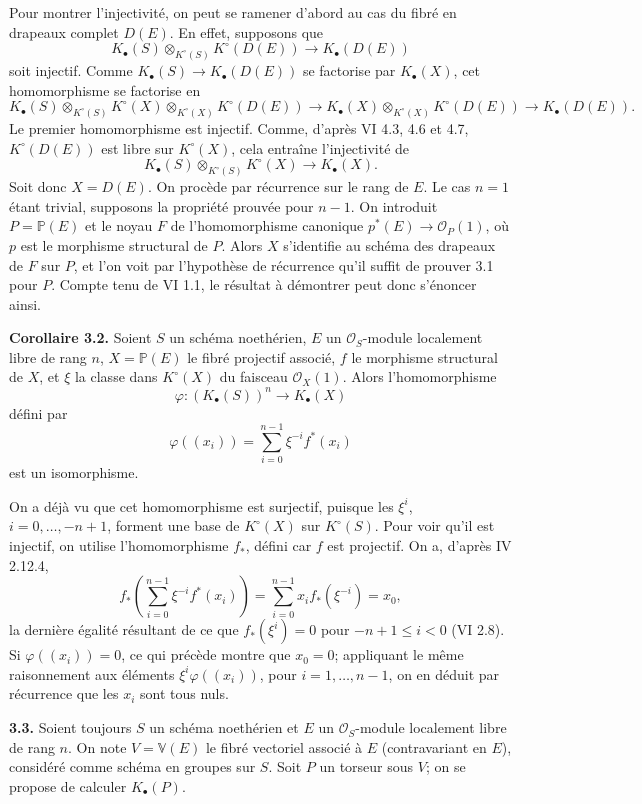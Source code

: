 \documentclass[11pt]{article}
\begin{document}
Pour montrer l'injectivité, on peut se ramener d'abord au cas du fibré en drapeaux complet $D(E)$. En effet, supposons que
\[
K_\bullet(S)\otimes_{K^\circ(S)}K^\circ(D(E))\longrightarrow K_\bullet(D(E))
\]
soit injectif. Comme $K_\bullet(S)\to K_\bullet(D(E))$ se factorise par $K_\bullet(X)$, cet homomorphisme se factorise en
\[
K_\bullet(S)\otimes_{K^\circ(S)}K^\circ(X)\otimes_{K^\circ(X)}K^\circ(D(E))
\longrightarrow K_\bullet(X)\otimes_{K^\circ(X)}K^\circ(D(E))
\longrightarrow K_\bullet(D(E)).
\]
Le premier homomorphisme est injectif. Comme, d'après VI 4.3, 4.6 et 4.7, $K^\circ(D(E))$ est libre sur $K^\circ(X)$, cela entraîne l'injectivité de
\[
K_\bullet(S)\otimes_{K^\circ(S)}K^\circ(X)\to K_\bullet(X).
\]
Soit donc $X=D(E)$. On procède par récurrence sur le rang de $E$. Le cas $n=1$ étant trivial, supposons la propriété prouvée pour $n-1$. On introduit $P=\mathbb P(E)$ et le noyau $F$ de l'homomorphisme canonique $p^*(E)\to \mathcal O_P(1)$, où $p$ est le morphisme structural de $P$. Alors $X$ s'identifie au schéma des drapeaux de $F$ sur $P$, et l'on voit par l'hypothèse de récurrence qu'il suffit de prouver 3.1 pour $P$. Compte tenu de VI 1.1, le résultat à démontrer peut donc s'énoncer ainsi.

\textbf{Corollaire 3.2.} Soient $S$ un schéma noethérien, $E$ un $\mathcal O_S$-module localement libre de rang $n$, $X=\mathbb P(E)$ le fibré projectif associé, $f$ le morphisme structural de $X$, et $\xi$ la classe dans $K^\circ(X)$ du faisceau $\mathcal O_X(1)$. Alors l'homomorphisme
\[
\varphi:(K_\bullet(S))^n\longrightarrow K_\bullet(X)
\]
défini par
\[
\varphi((x_i))=\sum_{i=0}^{n-1}\xi^{-i}f^*(x_i)
\]
est un isomorphisme.

On a déjà vu que cet homomorphisme est surjectif, puisque les $\xi^i$, $i=0,\ldots,-n+1$, forment une base de $K^\circ(X)$ sur $K^\circ(S)$. Pour voir qu'il est injectif, on utilise l'homomorphisme $f_*$, défini car $f$ est projectif. On a, d'après IV 2.12.4,
\[
f_*\left(\sum_{i=0}^{n-1}\xi^{-i}f^*(x_i)\right)
=\sum_{i=0}^{n-1}x_i f_*(\xi^{-i})=x_0,
\]
la dernière égalité résultant de ce que $f_*(\xi^i)=0$ pour $-n+1\le i<0$ (VI 2.8). Si $\varphi((x_i))=0$, ce qui précède montre que $x_0=0$; appliquant le même raisonnement aux éléments $\xi^i\varphi((x_i))$, pour $i=1,\ldots,n-1$, on en déduit par récurrence que les $x_i$ sont tous nuls.

\textbf{3.3.} Soient toujours $S$ un schéma noethérien et $E$ un $\mathcal O_S$-module localement libre de rang $n$. On note $V=\mathbb V(E)$ le fibré vectoriel associé à $E$ (contravariant en $E$), considéré comme schéma en groupes sur $S$. Soit $P$ un torseur sous $V$; on se propose de calculer $K_\bullet(P)$.
\end{document}
